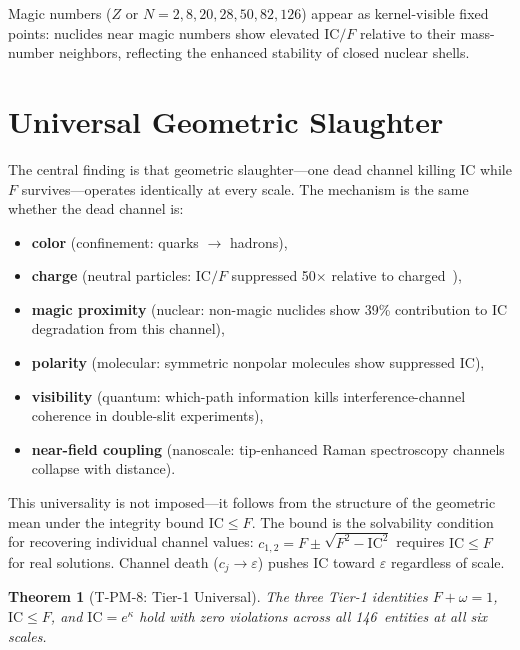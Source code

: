 \documentclass[
  aps,
  prd,
  twocolumn,
  superscriptaddress,
  nofootinbib,
  floatfix
]{revtex4-2}
\newtheorem{theorem}{Theorem}
\newcommand{\eps}{\varepsilon}
\newcommand{\IC}{\mathrm{IC}}
\begin{document}
Magic numbers ($Z$ or $N = 2, 8, 20, 28, 50, 82, 126$)
appear as kernel-visible fixed points: nuclides near magic
numbers show elevated $\IC/F$ relative to their mass-number
neighbors, reflecting the enhanced stability of closed nuclear
shells.

\section{Universal Geometric Slaughter}\label{sec:universal}

The central finding is that geometric slaughter---one dead
channel killing $\IC$ while $F$ survives---operates identically
at every scale.  The mechanism is the same whether the dead
channel is:

\begin{itemize}
  \item \textbf{color} (confinement: quarks $\to$ hadrons),
  \item \textbf{charge} (neutral particles: $\IC/F$ suppressed
    50$\times$ relative to charged~\cite{pdg2024}),
  \item \textbf{magic proximity} (nuclear: non-magic nuclides
    show 39\% contribution to $\IC$ degradation from this
    channel),
  \item \textbf{polarity} (molecular: symmetric nonpolar
    molecules show suppressed $\IC$),
  \item \textbf{visibility} (quantum: which-path information
    kills interference-channel coherence in double-slit
    experiments),
  \item \textbf{near-field coupling} (nanoscale: tip-enhanced
    Raman spectroscopy channels collapse with distance).
\end{itemize}

This universality is not imposed---it follows from the
structure of the geometric mean under the integrity bound
$\IC \leq F$.  The bound is the solvability condition for
recovering individual channel values: $c_{1,2} = F \pm
\sqrt{F^2 - \IC^2}$ requires $\IC \leq F$ for real
solutions.  Channel death ($c_j \to \eps$) pushes $\IC$
toward $\eps$ regardless of scale.

\begin{theorem}[T-PM-8: Tier-1 Universal]
\label{thm:tier1}
The three Tier-1 identities $F + \omega = 1$, $\IC \leq F$,
and $\IC = e^{\kappa}$ hold with zero violations across all
146~entities at all six scales.
\end{theorem}
\end{document}
